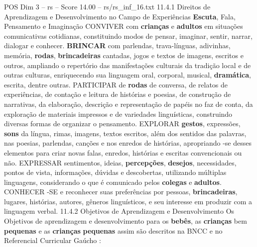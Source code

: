 \begin{textsample}{POS Dim 3 – rs – Score 14.00 – rs/rs\_inf\_16.txt}  \label{ex:f3_pos_250}
11.4.1 Direitos de Aprendizagem e Desenvolvimento no Campo de Experiências \textbf{Escuta}, Fala, Pensamento e Imaginação CONVIVER com \textbf{crianças} e \textbf{adultos} em situações comunicativas cotidianas, constituindo modos de pensar, imaginar, sentir, narrar, dialogar e conhecer. \textbf{BRINCAR} com parlendas, trava-línguas, adivinhas, memória, \textbf{rodas}, \textbf{brincadeiras} cantadas, jogos e textos de imagens, escritos e outros, ampliando o repertório das manifestações culturais da tradição local e de outras culturas, enriquecendo sua linguagem oral, corporal, musical, \textbf{dramática}, escrita, dentre outras.
PARTICIPAR de \textbf{rodas} de conversa, de relatos de experiências, de contação e leitura de histórias e poesias, de construção de narrativas, da elaboração, descrição e representação de papéis no faz de conta, da exploração de materiais impressos e de variedades linguísticas, construindo diversas formas de organizar o pensamento.
EXPLORAR \textbf{gestos}, expressões, \textbf{sons} da língua, rimas, imagens, textos escritos, além dos sentidos das palavras, nas poesias, parlendas, canções e nos enredos de histórias, apropriando -se desses elementos para criar novas falas, enredos, histórias e escritas convencionais ou não.
EXPRESSAR sentimentos, ideias, \textbf{percepções}, \textbf{desejos}, necessidades, pontos de vista, informações, dúvidas e descobertas, utilizando múltiplas linguagens, considerando o que é comunicado pelos \textbf{colegas} e \textbf{adultos}.
CONHECER -SE e reconhecer suas preferências por pessoas, \textbf{brincadeiras}, lugares, histórias, autores, gêneros linguísticos, e seu interesse em produzir com a linguagem verbal. 11.4.2 Objetivos de Aprendizagem e Desenvolvimento Os Objetivos de aprendizagem e desenvolvimento para os \textbf{bebês}, as \textbf{crianças} bem \textbf{pequenas} e as \textbf{crianças} \textbf{pequenas} assim são descritos na BNCC e no Referencial Curricular Gaúcho :

\end{textsample}
